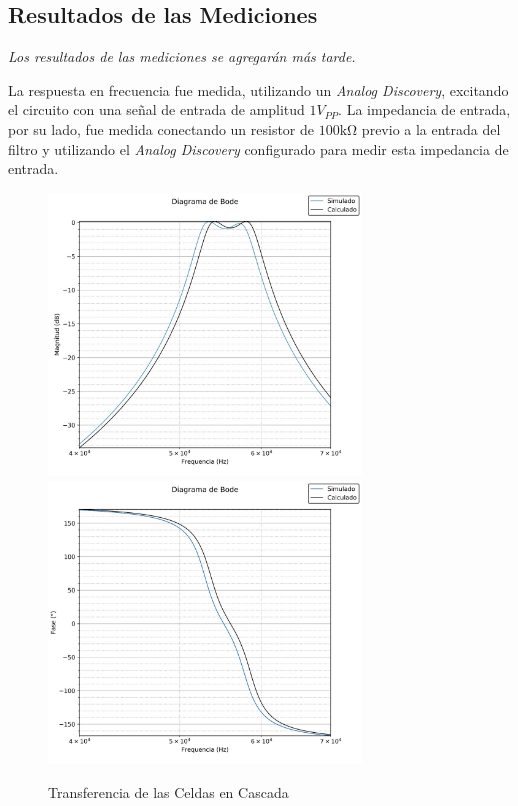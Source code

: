 \subsection{Resultados de las Mediciones}

\textit{Los resultados de las mediciones se agregarán más tarde.}

La respuesta en frecuencia fue medida, utilizando un \textit{Analog Discovery}, excitando el circuito con una señal de entrada de amplitud $1 V_{PP}$. La impedancia de entrada, por su lado, fue medida conectando un resistor de $100 \si{\kilo\ohm}$ previo a la entrada del filtro y utilizando el \textit{Analog Discovery} configurado para medir esta impedancia de entrada.

\begin{figure}[ht]
\begin{center}
\includegraphics[height=7.5cm]{../Ex2/Informe/TransferenciaTotal.jpeg}
\includegraphics[height=7.5cm]{../Ex2/Informe/FaseTotal.jpeg}
\caption{Transferencia de las Celdas en Cascada}
\label{fig:e2 H total}
\end{center}
\end{figure}

